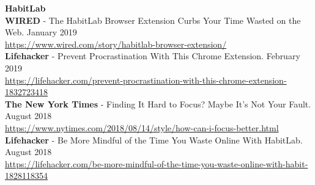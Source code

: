 
\textcolor{sectcol}{\textbf{HabitLab}}\\

\textbf{WIRED} - The HabitLab Browser Extension Curbs Your Time Wasted on the Web. \hfill January 2019\\
\url{https://www.wired.com/story/habitlab-browser-extension/}\\

\textbf{Lifehacker} - Prevent Procrastination With This Chrome Extension. \hfill February 2019\\
\url{https://lifehacker.com/prevent-procrastination-with-this-chrome-extension-1832723418}\\

\textbf{The New York Times} - Finding It Hard to Focus? Maybe It’s Not Your Fault. \hfill August 2018\\
\url{https://www.nytimes.com/2018/08/14/style/how-can-i-focus-better.html}\\


\textbf{Lifehacker} - Be More Mindful of the Time You Waste Online With HabitLab. \hfill August 2018\\
\url{https://lifehacker.com/be-more-mindful-of-the-time-you-waste-online-with-habit-1828118354}\\




